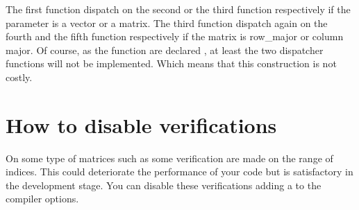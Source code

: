 \documentclass[a4paper,11pt,english]{sphinxmanual}
\begin{document}
\sphinxAtStartPar
The first function dispatch on the second or the third function respectively if the parameter is a vector or a matrix. The third function dispatch again on the fourth and the fifth function respectively if the matrix is row\_major or column major. Of course, as the function are declared , at least the two dispatcher functions will not be implemented. Which means that this construction is not costly.


\chapter{How to disable verifications}
\label{\detokenize{gmm/noverif:how-to-disable-verifications}}\label{\detokenize{gmm/noverif:gmm-noverif}}\label{\detokenize{gmm/noverif::doc}}
\sphinxAtStartPar
On some type of matrices such as  some verification are made on the range of indices. This could deteriorate  the performance of your code but is satisfactory in the development stage. You can disable these verifications adding a  to the compiler options.



\renewcommand{\indexname}{Index}
\printindex
\end{document}
